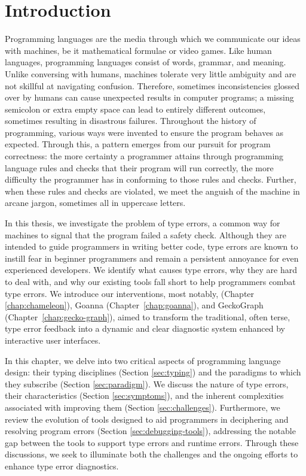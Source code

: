 
\chapter{Introduction}

\label{chap:introduction} 

\graphicspath{{Figures/Introduction}}

Programming languages are the media through which we communicate our ideas with machines, be it mathematical formulae or video games. Like human languages, programming languages consist of words, grammar, and meaning. Unlike conversing with humans, machines tolerate very little ambiguity and are not skillful at navigating confusion. Therefore, sometimes inconsistencies glossed over by humans can cause unexpected results in computer programs; a missing semicolon or extra empty space can lead to entirely different outcomes, sometimes resulting in disastrous failures. Throughout the history of programming, various ways were invented to ensure the program behaves as expected. Through this, a pattern emerges from our pursuit for program correctness: the more certainty a programmer attains through programming language rules and checks that their program will run correctly, the more difficulty the programmer has in conforming to those rules and checks. Further, when these rules and checks are violated, we meet the anguish of the machine in arcane jargon, sometimes all in uppercase letters.

In this thesis, we investigate the problem of type errors, a common way for machines to signal that the program failed a safety check. Although they are intended to guide programmers in writing better code, type errors are known to instill fear in beginner programmers and remain a persistent annoyance for even experienced developers. We identify what causes type errors, why they are hard to deal with, and why our existing tools fall short to help programmers combat type errors. We introduce our interventions, most notably, \chameleon{} (Chapter \ref{chap:chameleon}), Goanna (Chapter~\ref{chap:goanna}), and GeckoGraph (Chapter~\ref{chap:gecko-graph}), aimed to transform the traditional, often terse, type error feedback into a dynamic and clear diagnostic system enhanced by interactive user interfaces. 


In this chapter, we delve into two critical aspects of programming language design: their typing disciplines (Section \ref{sec:typing}) and the paradigms to which they subscribe (Section \ref{sec:paradigm}). We discuss the nature of type errors, their characteristics (Section \ref{sec:symptoms}), and the inherent complexities associated with improving them (Section \ref{sec:challenges}). Furthermore, we review the evolution of tools designed to aid programmers in deciphering and resolving program errors (Section \ref{sec:debugging-tools}), addressing the notable gap between the tools to support type errors and runtime errors. Through these discussions, we seek to illuminate both the challenges and the ongoing efforts to enhance type error diagnostics.


